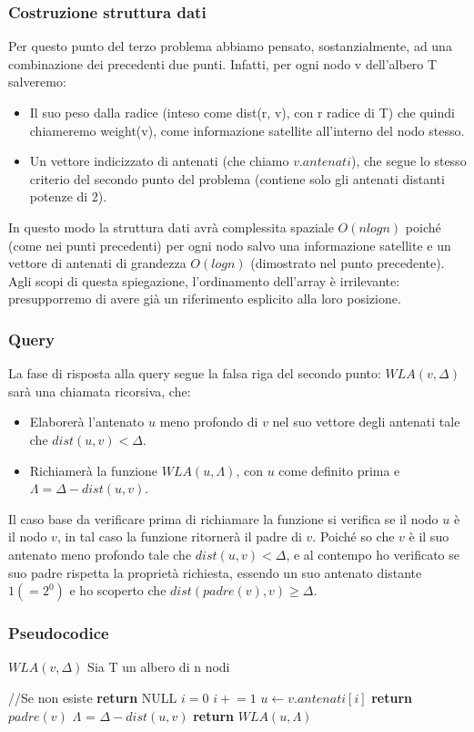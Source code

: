 \documentclass{article}
\begin{document}
\subsubsection{Costruzione struttura dati}
Per questo punto del terzo problema abbiamo pensato, sostanzialmente, ad una combinazione dei precedenti due punti. Infatti, per ogni nodo v dell'albero T salveremo:
\begin{itemize}
	\item Il suo peso dalla radice (inteso come dist(r, v), con r radice di T) che quindi chiameremo weight(v), come informazione satellite all'interno del nodo stesso.
	\item Un vettore indicizzato di antenati (che chiamo $v.antenati$), che segue lo stesso criterio del secondo punto del problema (contiene solo gli antenati distanti potenze di 2).
\end{itemize}
In questo modo la struttura dati avrà complessita spaziale $O(n logn)$ poiché (come nei punti precedenti) per ogni nodo salvo una informazione satellite e un vettore di antenati di grandezza $O(logn)$ (dimostrato nel punto precedente).
Agli scopi di questa spiegazione, l'ordinamento dell'array è irrilevante: presupporremo di avere già un riferimento esplicito alla loro posizione.
\subsubsection{Query}
La fase di risposta alla query segue la falsa riga del secondo punto: $WLA(v, \Delta)$ sarà una chiamata ricorsiva, che:
\begin{itemize}
	\item Elaborerà l'antenato $u$ meno profondo di $v$ nel suo vettore degli antenati tale che $dist(u, v) < \Delta$.
	\item Richiamerà la funzione $WLA(u,  \Lambda)$, con $u$ come definito prima e $\Lambda = \Delta - dist(u,v)$.
\end{itemize}
Il caso base da verificare prima di richiamare la funzione si verifica se il nodo $u$ è il nodo $v$, in tal caso la funzione ritornerà il padre di $v$. Poiché so che $v$ è il suo antenato meno profondo tale che $dist(u, v) < \Delta$, e al contempo ho verificato se suo padre rispetta la proprietà richiesta, essendo un suo antenato distante $1 (= 2^0)$ e ho scoperto che $dist(padre(v), v) \ge \Delta$.


\subsubsection{Pseudocodice}
$WLA(v, \Delta)$\newline
Sia T un albero di n nodi
\begin{algorithmic}
	 //Se non esiste
	\State \textbf{return} NULL
	\EndIf
	\State $i = 0$
	\State $i \mathrel{+}= 1$
	\EndWhile
	\State $u \gets v.antenati[i]$
	\State \textbf{return} $padre(v)$
	\Else
	\State $\Lambda$ = $\Delta - dist(u, v)$
	\State \textbf{return} $WLA(u, \Lambda)$
	\EndIf
\end{algorithmic}
\end{document}
